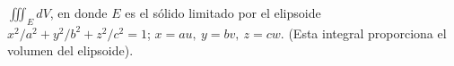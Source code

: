\item $\iiint_E dV$, en donde $E$ es el sólido limitado por el elipsoide $x^2/a^2 + y^2/b^2 + z^2/c^2 = 1$; $x = au, \ y = bv, \ z = cw$. (Esta integral proporciona el volumen del elipsoide).
